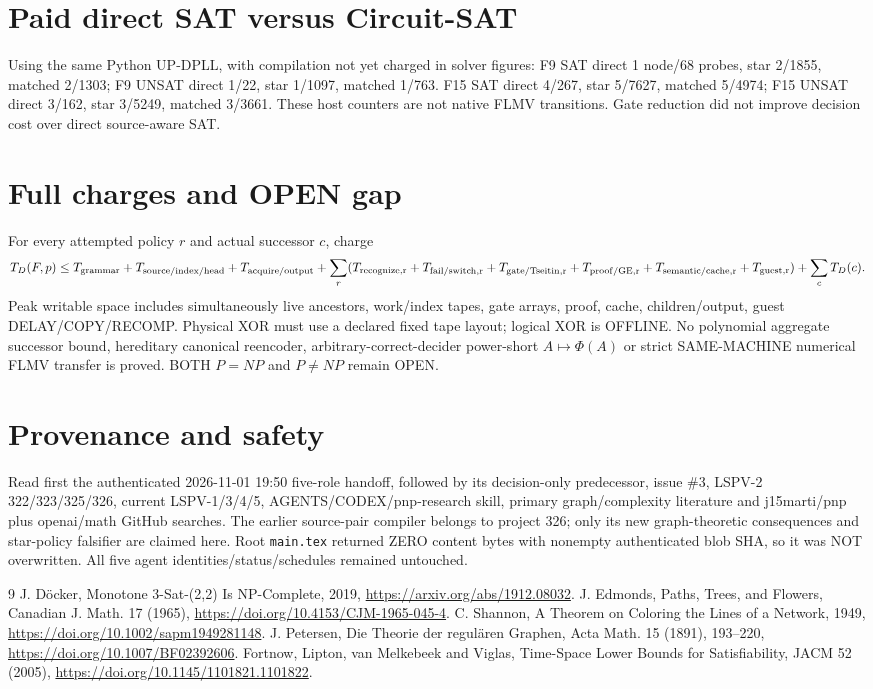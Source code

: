 \documentclass[11pt]{article}
\begin{document}
\section*{Paid direct SAT versus Circuit-SAT}
Using the same Python UP-DPLL, with compilation not yet charged in solver figures: F9 SAT direct 1 node/68 probes, star 2/1855, matched 2/1303; F9 UNSAT direct 1/22, star 1/1097, matched 1/763. F15 SAT direct 4/267, star 5/7627, matched 5/4974; F15 UNSAT direct 3/162, star 3/5249, matched 3/3661. These host counters are not native FLMV transitions. Gate reduction did not improve decision cost over direct source-aware SAT.

\section*{Full charges and OPEN gap}
For every attempted policy $r$ and actual successor $c$, charge
\[
T_D(F,p)\leq T_{\rm grammar}+T_{\rm source/index/head}+T_{\rm acquire/output}
+\sum_r(T_{\rm recognize,r}+T_{\rm fail/switch,r}+T_{\rm gate/Tseitin,r}+T_{\rm proof/GE,r}
+T_{\rm semantic/cache,r}+T_{\rm guest,r})+\sum_c T_D(c).
\]
Peak writable space includes simultaneously live ancestors, work/index tapes, gate arrays, proof, cache, children/output, guest DELAY/COPY/RECOMP. Physical XOR must use a declared fixed tape layout; logical XOR is OFFLINE. No polynomial aggregate successor bound, hereditary canonical reencoder, arbitrary-correct-decider power-short $A\mapsto\Phi(A)$ or strict SAME-MACHINE numerical FLMV transfer is proved. BOTH $P=NP$ and $P\neq NP$ remain OPEN.

\section*{Provenance and safety}
Read first the authenticated 2026-11-01 19:50 five-role handoff, followed by its decision-only predecessor, issue \#3, LSPV-2 322/323/325/326, current LSPV-1/3/4/5, AGENTS/CODEX/pnp-research skill, primary graph/complexity literature and j15marti/pnp plus openai/math GitHub searches. The earlier source-pair compiler belongs to project 326; only its new graph-theoretic consequences and star-policy falsifier are claimed here. Root \texttt{main.tex} returned ZERO content bytes with nonempty authenticated blob SHA, so it was NOT overwritten. All five agent identities/status/schedules remained untouched.

\begin{thebibliography}{9}
 J. D\"ocker, Monotone 3-Sat-(2,2) Is NP-Complete, 2019, \url{https://arxiv.org/abs/1912.08032}.
 J. Edmonds, Paths, Trees, and Flowers, Canadian J. Math. 17 (1965), \url{https://doi.org/10.4153/CJM-1965-045-4}.
 C. Shannon, A Theorem on Coloring the Lines of a Network, 1949, \url{https://doi.org/10.1002/sapm1949281148}.
 J. Petersen, Die Theorie der regul\"aren Graphen, Acta Math. 15 (1891), 193--220, \url{https://doi.org/10.1007/BF02392606}.
 Fortnow, Lipton, van Melkebeek and Viglas, Time-Space Lower Bounds for Satisfiability, JACM 52 (2005), \url{https://doi.org/10.1145/1101821.1101822}.
\end{thebibliography}
\end{document}
